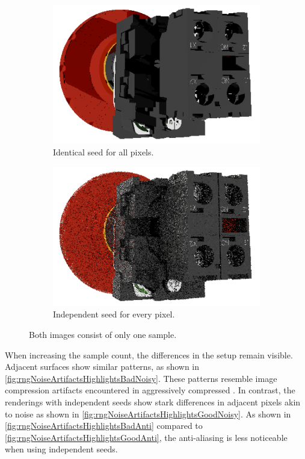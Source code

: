 \begin{figure}[H]
    \centering
    \begin{subfigure}[b]{0.45\textwidth}
        \includegraphics[width=\textwidth]{resources/single-sample-bad-seed.png}
        \caption{Identical seed for all pixels.}
        \label{fig:rngBadSeed}
    \end{subfigure}
    \hfill
    \begin{subfigure}[b]{0.45\textwidth}
        \includegraphics[width=\textwidth]{resources/single-sample-good-seed.png}
        \caption{Independent seed for every pixel.}
        \label{fig:rngGoodSeed}
    \end{subfigure}
    \caption{Both images consist of only one sample.}
    \label{fig:rngSeed}
\end{figure}

When increasing the sample count, the differences in the setup remain visible. Adjacent surfaces show similar patterns, as shown in \autoref{fig:rngNoiseArtifactsHighlightsBadNoisy}. These patterns resemble image compression artifacts encountered in aggressively compressed . In contrast, the renderings with independent seeds show stark differences in adjacent pixels akin to noise as shown in \autoref{fig:rngNoiseArtifactsHighlightsGoodNoisy}. As shown in \autoref{fig:rngNoiseArtifactsHighlightsBadAnti} compared to \autoref{fig:rngNoiseArtifactsHighlightsGoodAnti}, the anti-aliasing is less noticeable when using independent seeds.

